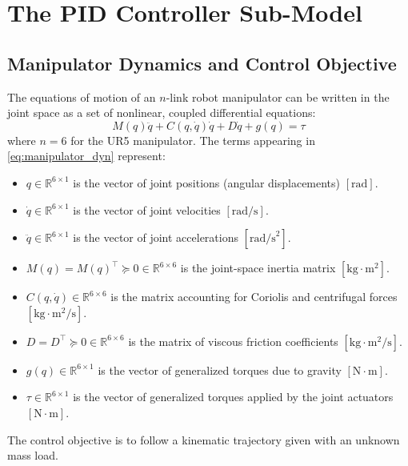 \chapter{The PID Controller Sub-Model}
\label{chap:pd}

\section{Manipulator Dynamics and Control Objective}

The equations of motion of an $n$-link robot manipulator can be written in the joint space as a set of nonlinear, coupled differential equations:
\begin{equation}
  M(q)\ddot{q} + C(q,\dot{q})\dot{q} + D\dot{q} + g(q) = \tau
  \label{eq:manipulator_dyn}
\end{equation}
where $n=6$ for the UR5 manipulator. The terms appearing in \cref{eq:manipulator_dyn} represent:
\begin{itemize}
  \item $q \in \mathbb{R}^{6\times1}$ is the vector of joint positions (angular displacements) $[\text{rad}]$.
  \item $\dot{q} \in \mathbb{R}^{6\times1}$ is the vector of joint velocities $[\text{rad/s}]$.
  \item $\ddot{q} \in \mathbb{R}^{6\times1}$ is the vector of joint accelerations $[\text{rad/s}^2]$.
  \item $M(q) = M(q)^\top \succeq 0 \in \mathbb{R}^{6\times6}$ is the joint-space inertia matrix $[\text{kg}\cdot\text{m}^2]$.
  \item $C(q,\dot{q}) \in \mathbb{R}^{6\times6}$ is the matrix accounting for Coriolis and centrifugal forces $[\text{kg}\cdot\text{m}^2/\text{s}]$.
  \item $D = D^\top \succeq 0 \in \mathbb{R}^{6\times6}$ is the matrix of viscous friction coefficients $[\text{kg}\cdot\text{m}^2/\text{s}]$.
  \item $g(q) \in \mathbb{R}^{6\times1}$ is the vector of generalized torques due to gravity $[\text{N}\cdot\text{m}]$.
  \item $\tau \in \mathbb{R}^{6\times1}$ is the vector of generalized torques applied by the joint actuators $[\text{N}\cdot\text{m}]$.
\end{itemize}

The control objective is to follow a kinematic trajectory given with an unknown mass load. 

